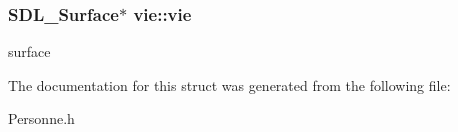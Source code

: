 \subsubsection[{\texorpdfstring{vie}{vie}}]{\setlength{\rightskip}{0pt plus 5cm}S\+D\+L\+\_\+\+Surface$\ast$ vie\+::vie}\hypertarget{structvie_a5cfd108ccc19244f76e448b73ea3deb3}{}\label{structvie_a5cfd108ccc19244f76e448b73ea3deb3}
surface 

The documentation for this struct was generated from the following file\+:\begin{DoxyCompactItemize}
\item 
Personne.\+h\end{DoxyCompactItemize}
